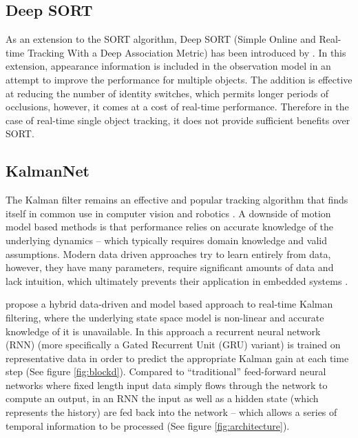\documentclass[a4paper,twoside,12pt]{report}
\begin{document}
\subsection{Deep SORT}

As an extension to the SORT algorithm, Deep SORT (Simple Online and Real-time Tracking With a Deep Association Metric) has been introduced by \cite{deepsort}. In this extension, appearance information is included in the observation model in an attempt to improve the performance for multiple objects. The addition is effective at reducing the number of identity switches, which permits longer periods of occlusions, however, it comes at a cost of real-time performance. Therefore in the case of real-time single object tracking, it does not provide sufficient benefits over SORT. 

\pagebreak
\subsection{KalmanNet}

The Kalman filter remains an effective and popular tracking algorithm that finds itself in common use in computer vision and robotics \citep{kalmanforever}. A downside of motion model based methods is that performance relies on accurate knowledge of the underlying dynamics -- which typically requires domain knowledge and valid assumptions. Modern data driven approaches try to learn entirely from data, however, they have many parameters, require significant amounts of data and lack intuition, which ultimately prevents their application in embedded systems \citep{kalmannet}.

\cite{kalmannet} propose a hybrid data-driven and model based approach to real-time Kalman filtering, where the underlying state space model is non-linear and accurate knowledge of it is unavailable. In this approach a recurrent neural network (RNN) (more specifically a Gated Recurrent Unit (GRU) variant) is trained on representative data in order to predict the appropriate Kalman gain at each time step  (See figure \ref{fig:blockd}). Compared to ``traditional'' feed-forward neural networks where fixed length input data simply flows through the network to compute an output, in an RNN the input as well as a hidden state (which represents the history) are fed back into the network -- which allows a series of temporal information to be processed  (See figure \ref{fig:architecture}). 
\end{document}

